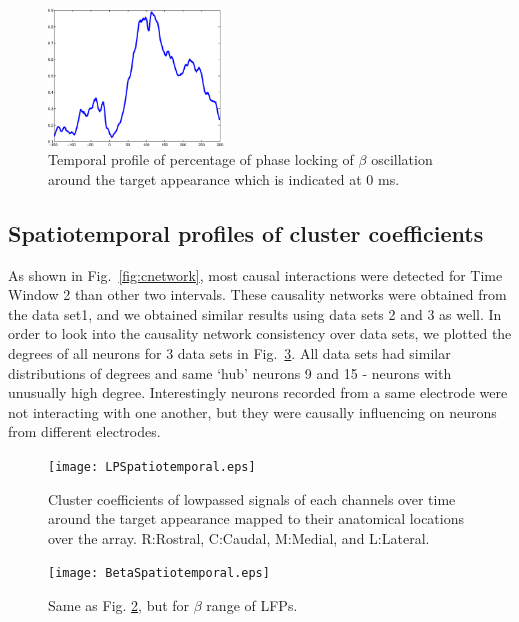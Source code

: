 \documentclass[letterpaper, 9pt, conference]{ieeeconf}
\begin{document}
\begin{figure}[ht!]
\begin{minipage}{10pc}
\includegraphics[width=11pc]{betaPPL.eps}
\caption{\label{label}Temporal profile of percentage of phase locking of $\beta$ oscillation around the target appearance which is indicated at $0$ ms.}
\end{minipage} 
\end{figure}


\subsection{Spatiotemporal profiles of cluster coefficients}

As shown in Fig.~\ref{fig:cnetwork}, most causal interactions were
detected for Time Window 2 than other two intervals. These
causality networks were obtained from the data set1, and we
obtained similar results using data sets 2 and 3 as well. In order
to look into the causality network consistency over data sets, we
plotted the degrees of all neurons for 3 data sets in
Fig.~\ref{fig:degree}.  All data sets had similar distributions of
degrees and same `hub' neurons 9 and 15 - neurons with unusually
high degree. Interestingly neurons recorded from a same electrode
were not interacting with one another, but they were causally
influencing on neurons from different electrodes.

\begin{figure}[ht!]
\begin{center}
\texttt{[image: LPSpatiotemporal.eps]}
\end{center}
\caption{Cluster coefficients of lowpassed signals of each channels over time around the target appearance mapped to their anatomical locations over the array. R:Rostral, C:Caudal, M:Medial, and L:Lateral.}
\label{fig:STmapLP}
\end{figure}
\begin{figure}[ht!]
\begin{center}
\texttt{[image: BetaSpatiotemporal.eps]}
\end{center}
\caption{Same as Fig. \ref{fig:STmapLP}, but for $\beta$ range of LFPs.}
\label{fig:degree}
\end{figure}
\end{document}
